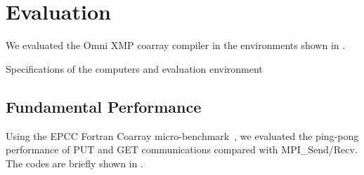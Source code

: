 ﻿\section{Evaluation}\label{sec:eval}

We evaluated the Omni XMP coarray compiler in the environments shown in .

\begin{table}[bth]
 \caption{Specifications of the computers and evaluation environment}\label{tab:specs}
 \begin{center}\small
  
 \end{center}
\end{table}

\subsection{Fundamental Performance}


Using the EPCC Fortran Coarray micro-benchmark~\cite{EPCC}, we evaluated the ping-pong performance of PUT and GET communications compared with MPI\_Send/Recv.
The codes are briefly shown in .

